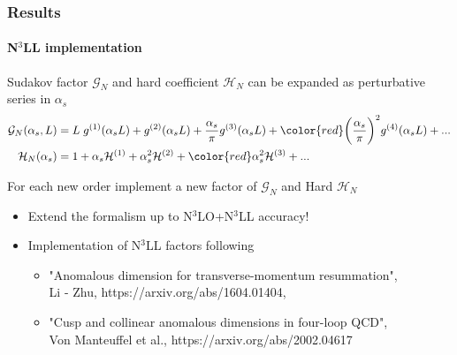 \documentclass[aspectratio=43]{beamer}
\begin{document}
\begin{frame}

	\frametitle{Results}
	\framesubtitle{N$^{3}$LL implementation}
	
	\footnotesize
	
	Sudakov factor $\mathcal{G}_{N}$ and hard coefficient $\mathcal{H}_{N}$ can be expanded as perturbative series in $\alpha_{s}$
	\begin{align}
		\mathcal{G}_{N}(\alpha_{s}, L) &= L\;g^{(1)}(\alpha_{s}L) + g^{(2)}(\alpha_{s}L) + \frac{\alpha_{s}}{\pi}g^{(3)}(\alpha_{s}L) + {\color{red} \bigg( \frac{\alpha_{s}}{\pi} \bigg) ^{2}g^{(4)}(\alpha_{s}L)} + ... \nonumber \\
		\mathcal{H}_{N}(\alpha_{s}) &= 1 + \alpha_{s}\mathcal{H}^{(1)} + \alpha_{s}^{2}\mathcal{H}^{(2)} + {\color{red}\alpha_{s}^{2}\mathcal{H}^{(3)}} + ...  \nonumber
	\end{align}
	
	For each new order implement a new factor of $\mathcal{G}_{N}$ and Hard $\mathcal{H}_{N}$
		
	\begin{itemize}
		\item Extend the formalism up to {\color{red}N$^{3}$LO+N$^{3}$LL} accuracy!
		\item Implementation of N$^{3}$LL factors following \\
		\begin{itemize}
			\item {\color{blue} "Anomalous dimension for transverse-momentum resummation", \\
			Li - Zhu, https://arxiv.org/abs/1604.01404},
			\item {\color{blue} "Cusp and collinear anomalous dimensions in four-loop QCD", \\
			Von Manteuffel et al., https://arxiv.org/abs/2002.04617}
		\end{itemize}
	\end{itemize}
	
\end{frame}
\end{document}
